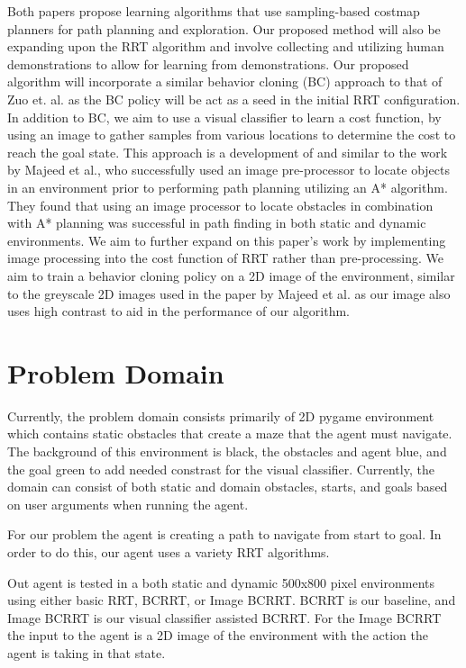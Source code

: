 \documentclass{article}
\begin{document}
Both papers propose learning algorithms that use sampling-based costmap planners for path planning and exploration. Our proposed method will also be expanding upon the RRT algorithm and involve collecting and utilizing human demonstrations to allow for learning from demonstrations. Our proposed algorithm will incorporate a similar behavior cloning (BC) approach to that of Zuo et. al. \cite{Zuo} as the BC policy will be act as a seed in the initial RRT configuration. In addition to BC, we aim to use a visual classifier to learn a cost function, by using an image to gather samples from various locations to determine the cost to reach the goal state. This approach is a development of and similar to the work by Majeed et al., who successfully used an image pre-processor to locate objects in an environment prior to performing path planning utilizing an A* algorithm. \cite{Majeed} They found that using an image processor to locate obstacles in combination with A* planning was successful in path finding in both static and dynamic environments. \cite{Majeed} We aim to further expand on this paper's work by implementing image processing into the cost function of RRT rather than pre-processing. We aim to train a behavior cloning policy on a 2D image of the environment, similar to the greyscale 2D images used in the paper by Majeed et al. as our image also uses high contrast to aid in the performance of our algorithm. 


\section{Problem Domain}

Currently, the problem domain consists primarily of 2D pygame environment which contains static obstacles that create a maze that the agent must navigate. The background of this environment is black, the obstacles and agent blue, and the goal green to add needed constrast for the visual classifier. Currently, the domain can consist of both static and domain obstacles, starts, and goals based on user arguments when running the agent. 

For our problem the agent is creating a path to navigate from start to goal. In order to do this, our agent uses a variety RRT algorithms.

Out agent is tested in a both static and dynamic 500x800 pixel environments using either basic RRT, BCRRT, or Image BCRRT. BCRRT is our baseline, and Image BCRRT is our visual classifier assisted BCRRT. For the Image BCRRT the input to the agent is a 2D image of the environment with the action the agent is taking in that state.
\end{document}
